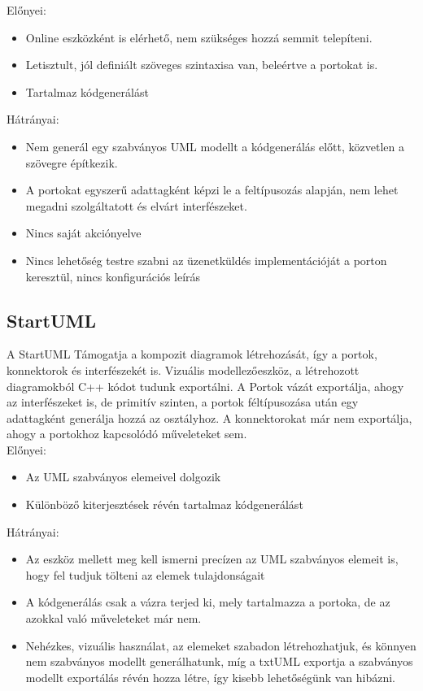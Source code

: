 \documentclass[a4paper,12pt]{report}
\begin{document}
Előnyei:
\begin{itemize}
\item Online eszközként is elérhető, nem szükséges hozzá semmit telepíteni.
\item Letisztult, jól definiált szöveges szintaxisa van, beleértve a portokat is.
\item Tartalmaz kódgenerálást
\end{itemize}
Hátrányai:
\begin{itemize}
\item Nem generál egy szabványos UML modellt a kódgenerálás előtt, közvetlen a szövegre építkezik.
\item A portokat egyszerű adattagként képzi le a feltípusozás alapján, nem lehet megadni szolgáltatott és elvárt interfészeket.
\item Nincs saját akciónyelve
\item Nincs lehetőség testre szabni az üzenetküldés implementációját a porton keresztül, nincs konfigurációs leírás
\end{itemize}

\subsection{StartUML}
A StartUML  Támogatja a kompozit diagramok létrehozását, így a portok, konnektorok és interfészekét is. Vizuális modellezőeszköz, a létrehozott diagramokból C++ kódot tudunk exportálni. A Portok vázát exportálja, ahogy az interfészeket is, de primitív szinten, a portok féltípusozása után egy adattagként generálja hozzá az osztályhoz. A konnektorokat már nem exportálja, ahogy a portokhoz kapcsolódó műveleteket sem. \\
Előnyei:
\begin{itemize}
\item Az UML szabványos elemeivel dolgozik
\item Különböző kiterjesztések révén tartalmaz kódgenerálást
\end{itemize}
Hátrányai:
\begin{itemize}
\item Az eszköz mellett meg kell ismerni precízen az UML szabványos elemeit is, hogy fel tudjuk tölteni az elemek tulajdonságait
\item A kódgenerálás csak a vázra terjed ki, mely tartalmazza a portoka, de az azokkal való műveleteket már nem.
\item Nehézkes, vizuális használat, az elemeket szabadon létrehozhatjuk, és könnyen nem szabványos modellt generálhatunk, míg a txtUML exportja a szabványos modellt exportálás révén hozza létre, így kisebb lehetőségünk van hibázni.
\end{itemize}
\end{document}
